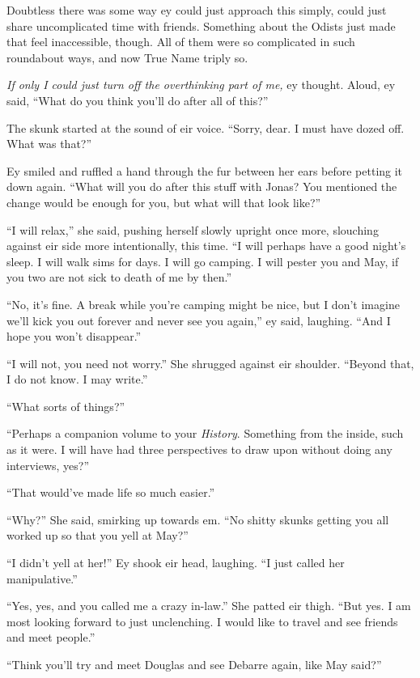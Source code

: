 Doubtless there was some way ey could just approach this simply, could just share uncomplicated time with friends. Something about the Odists just made that feel inaccessible, though. All of them were so complicated in such roundabout ways, and now True Name triply so.

\emph{If only I could just turn off the overthinking part of me,} ey thought. Aloud, ey said, ``What do you think you'll do after all of this?''

The skunk started at the sound of eir voice. ``Sorry, dear. I must have dozed off. What was that?''

Ey smiled and ruffled a hand through the fur between her ears before petting it down again. ``What will you do after this stuff with Jonas? You mentioned the change would be enough for you, but what will that look like?''

``I will relax,'' she said, pushing herself slowly upright once more, slouching against eir side more intentionally, this time. ``I will perhaps have a good night's sleep. I will walk sims for days. I will go camping. I will pester you and May, if you two are not sick to death of me by then.''

``No, it's fine. A break while you're camping might be nice, but I don't imagine we'll kick you out forever and never see you again,'' ey said, laughing. ``And I hope you won't disappear.''

``I will not, you need not worry.'' She shrugged against eir shoulder. ``Beyond that, I do not know. I may write.''

``What sorts of things?''

``Perhaps a companion volume to your \emph{History}. Something from the inside, such as it were. I will have had three perspectives to draw upon without doing any interviews, yes?''

``That would've made life so much easier.''

``Why?'' She said, smirking up towards em. ``No shitty skunks getting you all worked up so that you yell at May?''

``I didn't yell at her!'' Ey shook eir head, laughing. ``I just called her manipulative.''

``Yes, yes, and you called me a crazy in-law.'' She patted eir thigh. ``But yes. I am most looking forward to just unclenching. I would like to travel and see friends and meet people.''

``Think you'll try and meet Douglas and see Debarre again, like May said?''

